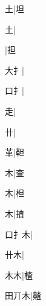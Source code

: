 \begin{multicols}{2}
{{\cjk{}{\cnsym{}　}{\cnsym{}　}土}|{\cjk{}坦}\par
{土}|{}\par
{}|{\cjk{}担}\par
{大{扌}}|{}\par
{\cjk{}{\cnsym{}　}口{扌}}|{}\par
{\cjk{}{\cnsym{}　}{\cnsym{}　}走}|{}\par
{\cjk{}{\cnsym{}　}{\cnsym{}　}卄}|{}\par
{\cjk{}{\cnsym{}　}{\cnsym{}　}革}|{\cjk{}靼}\par
{\cjk{}{\cnsym{}　}{\cnsym{}　}木}|{\cjk{}查}\par
{\cjk{}{\cnsym{}　}{\cnsym{}　}木}|{\cjk{}柦}\par
{木}|{\cjk{}揸}\par
{\cjk{}口{扌}木}|{}\par
{\cjk{}{\cnsym{}　}卄木}|{}\par
{\cjk{}{\cnsym{}　}木木}|{\cjk{}楂}\par
{\cjk{}田丌木}|{\cjk{}齄}\par
}
\end{multicols}
